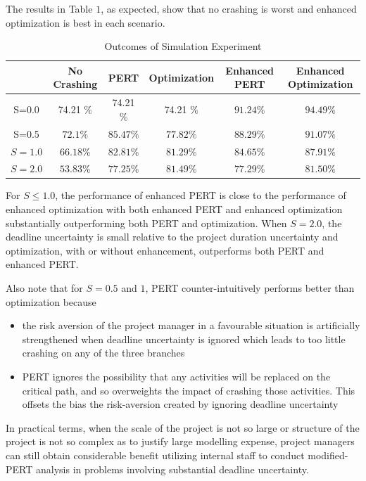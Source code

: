 \documentclass[11pt]{article}
\begin{document}
The results in Table $1$, as expected, show that no crashing is worst and enhanced optimization is best in each scenario. 
\begin{table}
        \centering
        \begin{tabular}{ |c||  c | c | c | c | c | } \hline   
       & No Crashing & PERT & Optimization &  Enhanced  PERT & 
       Enhanced  Optimization   \\
       \hline
      S=0.0  & 74.21 $\% $ & 74.21 $\%$ & 74.21 $\%$ & $91.24 \%$ & $94.49 \%$ \\
       S=0.5 & $72.1 \% $ & $85.47 \%$ & $77.82 \%$ & $88.29 \%$ & $91.07 \%$ \\
       $S=1.0$   & $66.18 \% $ & $82.81 \%$ & $81.29 \%$ & $84.65 \%$ & $87.91 \%$  \\
       $S=2.0$   & $53.83 \% $ & $77.25 \%$ & $81.49 \%$ & $77.29 \%$ & $81.50 \%$  \\
       \hline
           \end{tabular}
         \caption{Outcomes of Simulation Experiment}
         \end{table} 
For $S \leq 1.0$, the performance of enhanced PERT is close to the performance of enhanced optimization with both enhanced PERT and enhanced optimization substantially outperforming both PERT and optimization.  When $S = 2.0$, the deadline uncertainty is small relative to the project duration uncertainty and optimization, with or without enhancement, outperforms both PERT and enhanced PERT.\par
Also note that for
$S=0.5$ and $1$, PERT counter-intuitively performs better than optimization because 
\begin{itemize}
\item the risk aversion of the project manager in a favourable situation is artificially strengthened when deadline uncertainty is ignored which leads to too little crashing on any of the three branches
\item PERT ignores the possibility that any activities will be replaced on the critical path, and so overweights the impact of crashing those activities.  This offsets the bias the risk-aversion created by ignoring deadline uncertainty
\end{itemize}
 In practical terms, when the scale of the project is not so large or structure of the project is not so complex as to justify large modelling expense, project managers can still obtain considerable benefit utilizing internal staff to conduct modified-PERT analysis in problems involving substantial deadline uncertainty.
\end{document}
